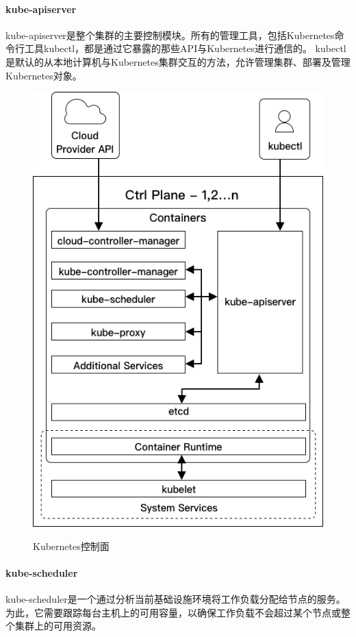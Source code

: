 \documentclass[macfonts,master]{njuthesis}
\begin{document}
\paragraph{kube-apiserver}
kube-apiserver是整个集群的主要控制模块。所有的管理工具，包括Kubernetes命令行工具kubectl，都是通过它暴露的那些API与Kubernetes进行通信的。 kubectl是默认的从本地计算机与Kubernetes集群交互的方法，允许管理集群、部署及管理Kubernetes对象。

\begin{figure}[htbp]
  \centering
  \includegraphics[width= 1\textwidth]{pics/K8s-ctrl-plane.png}\\
  \caption{Kubernetes控制面\cite{gorillaguide}}\label{fig:k8s-ctrl}
\end{figure}

\paragraph{kube-scheduler}
kube-scheduler是一个通过分析当前基础设施环境将工作负载分配给节点的服务。为此，它需要跟踪每台主机上的可用容量，以确保工作负载不会超过某个节点或整个集群上的可用资源\cite{introk8s}。
\end{document}
